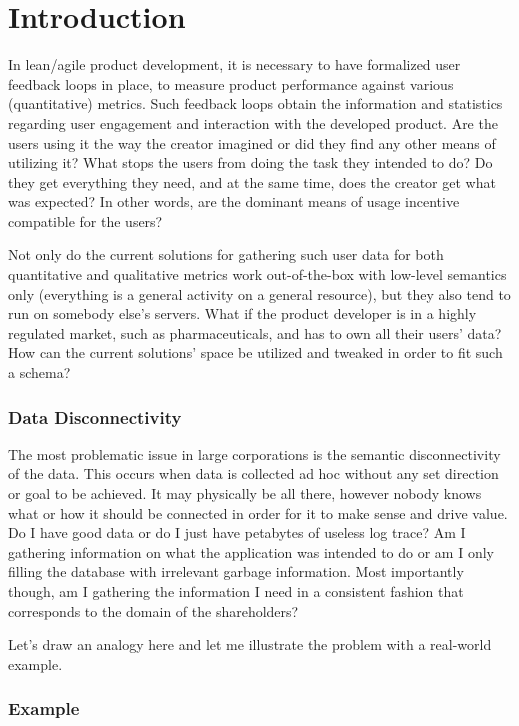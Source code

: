 \chapter{Introduction}

In lean/agile product development, it is necessary to have formalized user feedback loops in place, to measure product performance against various (quantitative) metrics. Such feedback loops obtain the information and statistics regarding user engagement and interaction with the developed product. Are the users using it the way the creator imagined or did they find any other means of utilizing it? What stops the users from doing the task they intended to do? Do they get everything they need, and at the same time, does the creator get what was expected? In other words, are the dominant means of usage incentive compatible for the users? 

Not only do the current solutions for gathering such user data for both quantitative and qualitative metrics work out-of-the-box with low-level semantics only (everything is a general activity on a general resource), but they also tend to run on somebody else's servers. What if the product developer is in a highly regulated market, such as pharmaceuticals, and has to own all their users' data? How can the current solutions' space be utilized and tweaked in order to fit such a schema?

\subsection*{Data Disconnectivity}

The most problematic issue in large corporations is the semantic disconnectivity of the data. This occurs when data is collected ad hoc without any set direction or goal to be achieved. It may physically be all there, however nobody knows what or how it should be connected in order for it to make sense and drive value. Do I have good data or do I just have petabytes of useless log trace? Am I gathering information on what the application was intended to do or am I only filling the database with irrelevant garbage information. Most importantly though, am I gathering the information I need in a consistent fashion that corresponds to the domain of the shareholders?

Let's draw an analogy here and let me illustrate the problem with a real-world example.

\newpage

\subsection*{Example}

